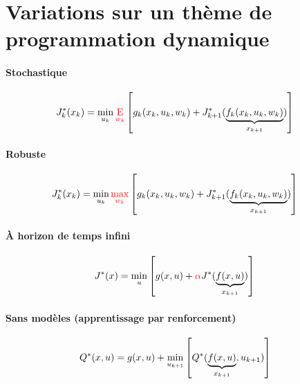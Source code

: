 \newpage
\section{Variations sur un thème de programmation dynamique}

\paragraph{Stochastique}

\begin{align}
J^*_k(x_k) = 
\operatornamewithlimits{min}\limits_{u_k}
{\color{red}
\operatornamewithlimits{E}\limits_{w_k}
}
&\left[
g_k(x_k , u_k , w_k ) + J^*_{k+1}( 
\underbrace{
f_k(x_k , u_k , w_k ) 
}_{x_{k+1}}
)
\right] 
\end{align} 

\paragraph{Robuste}

\begin{align}
J^*_k(x_k) = 
\operatornamewithlimits{min}\limits_{u_k}
{\color{red}
\operatornamewithlimits{max}\limits_{w_k}
}
&\left[
g_k(x_k , u_k , w_k ) + J^*_{k+1}( 
\underbrace{
f_k(x_k , u_k , w_k ) 
}_{x_{k+1}}
)
\right] 
\end{align} 

\paragraph{À horizon de temps infini}

\begin{align}
J^*(x) = 
\operatornamewithlimits{min}\limits_{u}
&\left[
g(x , u ) + {\color{red}\alpha} J^*( 
\underbrace{
f(x , u ) 
}_{x_{k+1}}
)
\right] 
\end{align} 

\paragraph{Sans modèles (apprentissage par renforcement)}

\begin{align}
Q^*(x, u ) = g(x , u ) + 
\operatornamewithlimits{min}\limits_{u_{k+1}}
&\left[
Q^*( 
\underbrace{
f(x , u ) 
}_{x_{k+1}}
, u_{k+1}
)
\right] 
\end{align} 

